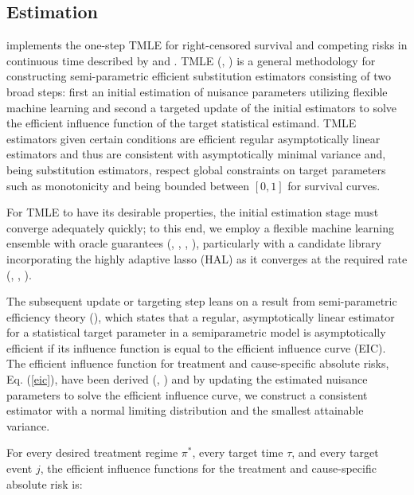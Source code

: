 \documentclass{report}
\newcommand{\1}{\ensuremath{\mathbf{1}}}
\newcommand{\trt}{\ensuremath{\pi^*}}
\newcommand{\tk}{\ensuremath{\tau}}
\newcommand{\jj}{\ensuremath{j}}
\begin{document}
\subsection{Estimation}
\label{sec:org49a5a12}
 implements the one-step TMLE for right-censored survival and competing risks in continuous time described by \cite{rytgaard_continuous-time_2021} and \cite{rytgaard_one-step_2021}. TMLE (\cite{laan_statistical_2006}, \cite{laan_targeted_2011}) is a general methodology for constructing semi-parametric efficient substitution estimators consisting of two broad steps: first an initial estimation of nuisance parameters utilizing flexible machine learning and second a targeted update of the initial estimators to solve the efficient influence function of the target statistical estimand. TMLE estimators given certain conditions are efficient regular asymptotically linear estimators and thus are consistent with asymptotically minimal variance and, being substitution estimators, respect global constraints on target parameters such as monotonicity and being bounded between \([0, 1]\) for survival curves.

For TMLE to have its desirable properties, the initial estimation stage must converge adequately quickly; to this end, we employ a flexible machine learning ensemble with oracle guarantees (\cite{laan_super_2007}, \cite{polley_superlearner_2021}, \cite{laan_unified_2003}, \cite{vaart_oracle_2006}), particularly with a candidate library incorporating the highly adaptive lasso (HAL) as it converges at the required rate (\cite{laan_generally_2017}, \cite{benkeser_highly_2016}, \cite{rytgaard_continuous-time_2021}). 

The subsequent update or targeting step leans on a result from semi-parametric efficiency theory (\cite{bickel_efficient_1998}), which states that a regular, asymptotically linear estimator for a statistical target parameter in a semiparametric model is asymptotically efficient if its influence function is equal to the efficient influence curve (EIC). The efficient influence function for treatment and cause-specific absolute risks, Eq. (\ref{eic}), have been derived (\cite{rytgaard_continuous-time_2021}, \cite{rytgaard_one-step_2021}) and by updating the estimated nuisance parameters to solve the efficient influence curve, we construct a consistent estimator with a normal limiting distribution and the smallest attainable variance. 

For every desired treatment regime \(\trt\), every target time \tk, and every target event \jj, the efficient influence functions for the treatment and cause-specific absolute risk is: 
\end{document}
